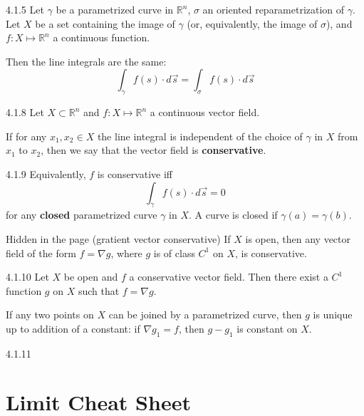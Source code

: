 \documentclass[8pt,a4paper,twocolumn,table]{extarticle}
\newcommand{\R}{\mathbb{R}}
\begin{document}
\begin{proposition}{4.1.5}
    Let $\gamma$ be a parametrized curve in $\R^n$, $\sigma$ an oriented reparametrization of $\gamma$.
    Let $X$ be a set containing the image of $\gamma$ (or, equivalently, the image of $\sigma$),
    and $f: X \mapsto \R^n$ a continuous function.

    Then the line integrals are the same:
    \[ \int_\gamma f(s) \cdot d \vec{s} = \int_\sigma f(s) \cdot d \vec{s} \]
\end{proposition}

\begin{definition}{4.1.8}
    Let $X \subset \R^n$ and $f: X \mapsto \R^n$ a continuous vector field.

    If for any $x_1, x_2 \in X$ the line integral is independent of the choice of $\gamma$ in $X$ from $x_1$ to $x_2$,
    then we say that the vector field is \textbf{conservative}.
\end{definition}

\begin{remark}{4.1.9}
    Equivalently, $f$ is conservative iff
    \[ \int_\gamma f(s) \cdot d\vec{s} = 0 \]
    for any \textbf{closed} parametrized curve $\gamma$ in $X$.
    A curve is closed if $\gamma(a) = \gamma(b)$.
\end{remark}

\begin{theorem}{Hidden in the page (gratient vector conservative)}
    If $X$ is open, then any vector field of the form $f = \nabla g$, where $g$ is of class $C^1$ on $X$, is conservative.
\end{theorem}

\begin{theorem}{4.1.10}
    Let $X$ be open and $f$ a conservative vector field.
    Then there exist a $C^1$ function $g$ on $X$ such that $f = \nabla g$.

    If any two points on $X$ can be joined by a parametrized curve, then $g$ is unique up to addition of a constant:
    if $\nabla g_1 = f$, then $g - g_1$ is constant on $X$.
\end{theorem}

\begin{remark}{4.1.11}
    
\end{remark}

\section{Limit Cheat Sheet}
\end{document}
